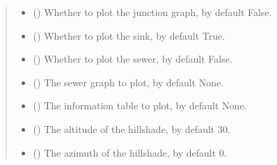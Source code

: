 \documentclass[letterpaper,10pt,english]{sphinxmanual}
\begin{document}
\begin{fulllineitems}
\begin{quote}
\begin{description}
\begin{itemize}
\item {} 
\sphinxAtStartPar
{} (\sphinxstyleliteralemphasis{\sphinxupquote{, }}) \textendash{} Whether to plot the junction graph, by default False.

\item {} 
\sphinxAtStartPar
{} (\sphinxstyleliteralemphasis{\sphinxupquote{, }}) \textendash{} Whether to plot the sink, by default True.

\item {} 
\sphinxAtStartPar
{} (\sphinxstyleliteralemphasis{\sphinxupquote{, }}) \textendash{} Whether to plot the sewer, by default False.

\item {} 
\sphinxAtStartPar
{} (\sphinxstyleliteralemphasis{\sphinxupquote{, }}) \textendash{} The sewer graph to plot, by default None.

\item {} 
\sphinxAtStartPar
{} (\sphinxstyleliteralemphasis{\sphinxupquote{, }}) \textendash{} The information table to plot, by default None.

\item {} 
\sphinxAtStartPar
{} (\sphinxstyleliteralemphasis{\sphinxupquote{, }}) \textendash{} The altitude of the hillshade, by default 30.

\item {} 
\sphinxAtStartPar
{} (\sphinxstyleliteralemphasis{\sphinxupquote{, }}) \textendash{} The azimuth of the hillshade, by default 0.


\end{itemize}
\end{description}
\end{quote}
\end{fulllineitems}
\end{document}
